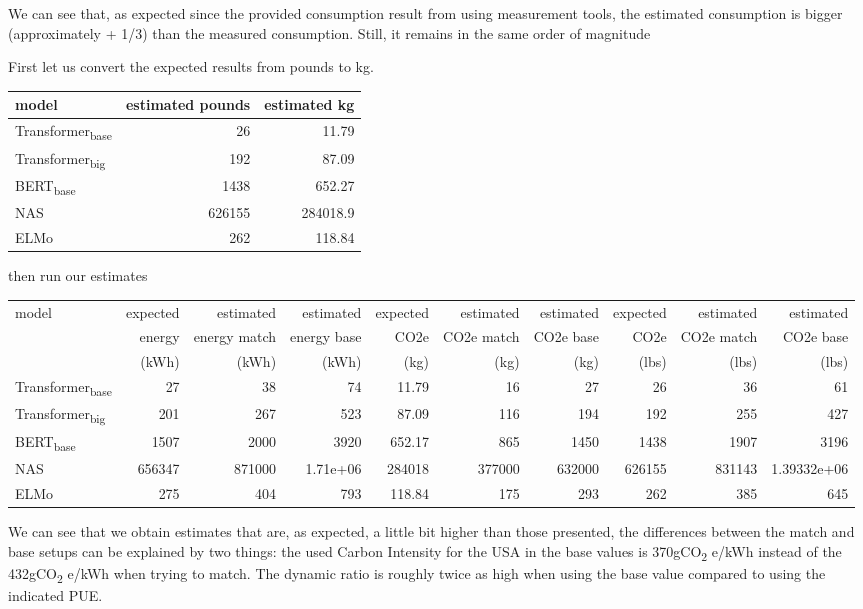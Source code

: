 \documentclass[11pt]{article}
\begin{document}
We can see that, as expected since the provided consumption result
from using measurement tools, the estimated consumption is bigger
(approximately + 1/3) than
the measured consumption. Still, it remains in the same order of
magnitude

First let us convert the expected results from pounds to kg.
\begin{center}
\begin{tabular}{lrr}
model & estimated pounds & estimated kg\\
\hline
Transformer\textsubscript{base} & 26 & 11.79\\
Transformer\textsubscript{big} & 192 & 87.09\\
BERT\textsubscript{base} & 1438 & 652.27\\
NAS & 626155 & 284018.9\\
ELMo & 262 & 118.84\\
\end{tabular}
\end{center}

then run our estimates
\begin{center}
\begin{tabular}{lrrrrrrrrr}
model & expected & estimated & estimated & expected & estimated & estimated & expected & estimated & estimated\\
 & energy & energy match & energy base & CO2e & CO2e match & CO2e base & CO2e & CO2e match & CO2e base\\
 & (kWh) & (kWh) & (kWh) & (kg) & (kg) & (kg) & (lbs) & (lbs) & (lbs)\\
\hline
Transformer\textsubscript{base} & 27 & 38 & 74 & 11.79 & 16 & 27 & 26 & 36 & 61\\
Transformer\textsubscript{big} & 201 & 267 & 523 & 87.09 & 116 & 194 & 192 & 255 & 427\\
BERT\textsubscript{base} & 1507 & 2000 & 3920 & 652.17 & 865 & 1450 & 1438 & 1907 & 3196\\
NAS & 656347 & 871000 & 1.71e+06 & 284018 & 377000 & 632000 & 626155 & 831143 & 1.39332e+06\\
ELMo & 275 & 404 & 793 & 118.84 & 175 & 293 & 262 & 385 & 645\\
\end{tabular}
\end{center}

We can see that we obtain estimates that are, as expected, a little
bit higher than those presented, the differences between the match and base setups can be explained by
two things: the used Carbon Intensity for the USA in the base values
is 370gCO\textsubscript{2} e/kWh instead of the 432gCO\textsubscript{2} e/kWh when trying to match.
The dynamic ratio is roughly twice as high when using the base value
compared to using the indicated PUE.
\end{document}
